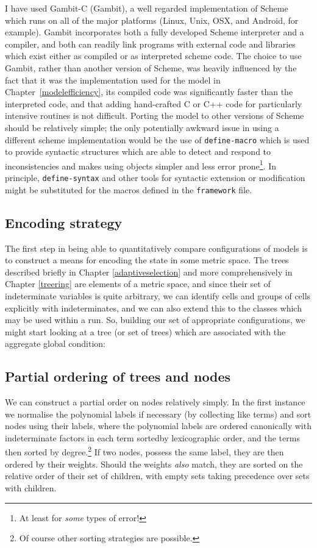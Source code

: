 I have used Gambit-C (Gambit), a well regarded implementation of
Scheme which runs on all of the major platforms (Linux, Unix, OSX, and
Android, for example). Gambit incorporates both a fully developed
Scheme interpreter and a compiler, and both can readily link programs
with external code and libraries which exist either as compiled or as
interpreted scheme code. The choice to use Gambit, rather than another
version of Scheme, was heavily influenced by the fact that it was the
implementation used for the model in Chapter~\ref{modelefficiency},
its compiled code was significantly faster than the interpreted code,
and that adding hand-crafted C or C++ code for particularly intensive
routines is not difficult.  Porting the model to other versions of
Scheme should be relatively simple; the only potentially awkward issue
in using a different scheme implementation would be the use of
\texttt{define-macro} which is used to provide syntactic structures
which are able to detect and respond to inconsistencies and makes
using objects simpler and less error prone\footnote{At least for
  \emph{some} types of error!}.  In principle, \texttt{define-syntax}
and other tools for syntactic extension or modification might be
substituted for the macros defined in the \texttt{framework} file. 

\subsection{Encoding strategy}
The first step in being able to quantitatively compare configurations
of models is to construct a means for encoding the state in some
metric space.  The trees described briefly in Chapter
\ref{adaptiveselection} and more comprehensively in Chapter
\ref{treering} are elements of a metric space, and since their set of
indeterminate variables is quite arbitrary, we can identify cells and
groups of cells explicitly with indeterminates, and we can also extend
this to the classes which may be used within a run.  So, building our
set of appropriate configurations, we might start looking at a tree
(or set of trees) which are associated with the aggregate global
condition:

\subsection{Partial ordering of trees and nodes}\label{partial-order}
We can construct a partial order on nodes relatively simply.  In the
first instance we normalise the polynomial labels if necessary (by
collecting like terms) and sort nodes using their labels, where the polynomial labels are
ordered canonically with indeterminate factors in each term sortedby
lexicographic order, and the terms then sorted by degree.\footnote{Of course
other sorting strategies are possible.} If two nodes, possess the same
label, they are then ordered by their weights.  Should the weights
\emph{also} match, they are sorted on the relative order of their set
of children, with empty sets taking precedence over sets with
children.

